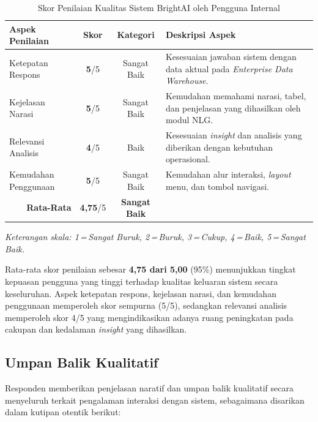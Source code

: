 \begin{table}[htbp]
\centering
\caption{Skor Penilaian Kualitas Sistem BrightAI oleh Pengguna Internal}
\label{tab:skor-umpan-balik}
\begin{tabular}{|p{5.5cm}|c|c|p{4.5cm}|}
\hline
\textbf{Aspek Penilaian} & \textbf{Skor} & \textbf{Kategori} & \textbf{Deskripsi Aspek} \\
\hline
Ketepatan Respons & \textbf{5}/5 & Sangat Baik & Ke\-se\-sua\-ian ja\-wa\-ban sis\-tem de\-ngan da\-ta ak\-tu\-al pa\-da \textit{Enterprise Data Warehouse}. \\
\hline
Kejelasan Narasi & \textbf{5}/5 & Sangat Baik & Ke\-mu\-dah\-an me\-ma\-ha\-mi na\-ra\-si, ta\-bel, dan pen\-je\-las\-an yang di\-ha\-sil\-kan o\-leh mo\-dul NLG. \\
\hline
Relevansi Analisis & \textbf{4}/5 & Baik & Ke\-se\-sua\-ian \textit{insight} dan ana\-li\-sis yang di\-be\-ri\-kan de\-ngan ke\-bu\-tuh\-an ope\-ra\-sio\-nal. \\
\hline
Kemudahan Penggunaan & \textbf{5}/5 & Sangat Baik & Kemudahan alur interaksi, \textit{layout} menu, dan tombol navigasi. \\
\hline
\multicolumn{1}{|r|}{\textbf{Rata-Rata}} & \textbf{4{,}75}/5 & \textbf{Sangat Baik} & \\
\hline
\end{tabular}
\begin{flushleft}
\footnotesize\textit{Keterangan skala: 1\,=\,Sangat Buruk, 2\,=\,Buruk, 3\,=\,Cukup, 4\,=\,Baik, 5\,=\,Sangat Baik.}
\end{flushleft}
\end{table}

Rata-rata skor penilaian sebesar \textbf{4{,}75 dari 5{,}00} (95\%) menunjukkan tingkat kepuasan pengguna yang tinggi terhadap kualitas keluaran sistem secara keseluruhan. Aspek ketepatan respons, kejelasan narasi, dan kemudahan penggunaan memperoleh skor sempurna (5/5), sedangkan relevansi analisis memperoleh skor 4/5 yang mengindikasikan adanya ruang peningkatan pada cakupan dan kedalaman \textit{insight} yang dihasilkan.

\subsection{Umpan Balik Kualitatif}

Responden memberikan penjelasan naratif dan umpan balik kualitatif secara menyeluruh terkait pengalaman interaksi dengan sistem, sebagaimana disarikan dalam kutipan otentik berikut:


